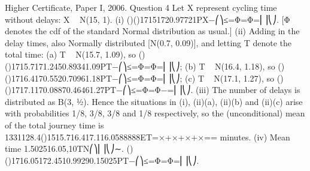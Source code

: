 Higher Certificate, Paper I, 2006. Question 4
Let X represent cycling time without delays: X ~ N(15, 1).
(i) ()()17151720.97721PX−⎛⎞≤=Φ=Φ=⎜⎟⎝⎠.
[Φ denotes the cdf of the standard Normal distribution as usual.]
(ii) Adding in the delay times, also Normally distributed [N(0.7, 0.09)], and letting T denote the total time:
(a) T ~ N(15.7, 1.09), so ()()1715.7171.2450.89341.09PT−⎛⎞≤=Φ=Φ=⎜⎟⎝⎠;
(b) T ~ N(16.4, 1.18), so ()()1716.4170.5520.70961.18PT−⎛⎞≤=Φ=Φ=⎜⎟⎝⎠;
(c) T ~ N(17.1, 1.27), so ()()1717.1170.08870.46461.27PT−⎛⎞≤=Φ=Φ−=⎜⎟⎝⎠.
(iii) The number of delays is distributed as B(3, ½). Hence the situations in (i), (ii)(a), (ii)(b) and (ii)(c) arise with probabilities 1/8, 3/8, 3/8 and 1/8 respectively, so the (unconditional) mean of the total journey time is
1331128.4()1515.716.417.116.0588888ET=×+×+×+×== minutes.
(iv) Mean time 1.502516.05,10TN⎛⎞⎜⎟⎝⎠∼.
()()1716.05172.4510.99290.15025PT−⎛⎞≤=Φ=Φ=⎜⎟⎝⎠.
